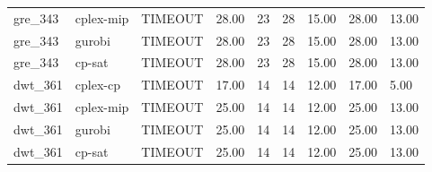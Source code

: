 \begin{tabular}{lllllllll}
gre\_343 & cplex-mip & TIMEOUT & 28.00 & 23 & 28 & 15.00 & 28.00 & 13.00 \\
gre\_343 & gurobi & TIMEOUT & 28.00 & 23 & 28 & 15.00 & 28.00 & 13.00 \\
gre\_343 & cp-sat & TIMEOUT & 28.00 & 23 & 28 & 15.00 & 28.00 & 13.00 \\
dwt\_361 & cplex-cp & TIMEOUT & 17.00 & 14 & 14 & 12.00 & 17.00 & 5.00 \\
dwt\_361 & cplex-mip & TIMEOUT & 25.00 & 14 & 14 & 12.00 & 25.00 & 13.00 \\
dwt\_361 & gurobi & TIMEOUT & 25.00 & 14 & 14 & 12.00 & 25.00 & 13.00 \\
dwt\_361 & cp-sat & TIMEOUT & 25.00 & 14 & 14 & 12.00 & 25.00 & 13.00 \\
\hline
\end{tabular}
